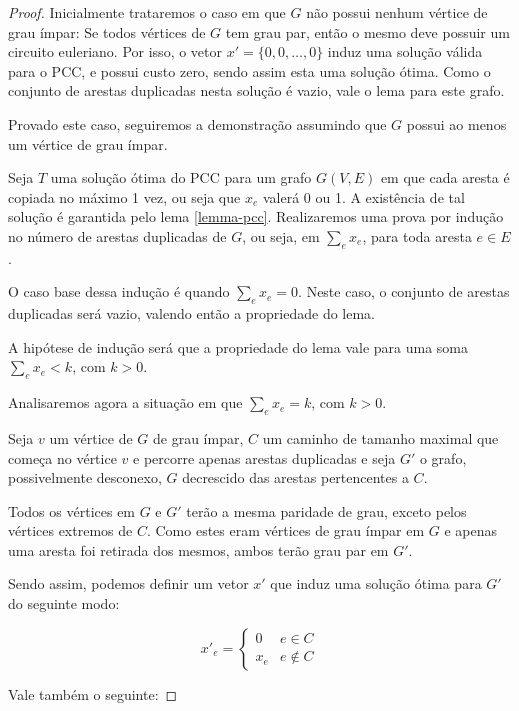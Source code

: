 \documentclass[12pt, a4paper]{article}
\begin{document}
\begin{proof}

    Inicialmente trataremos o caso em que $G$ não possui nenhum vértice de grau ímpar:
    Se todos vértices de $G$ tem grau par, então o mesmo deve possuir um circuito euleriano. 
    Por isso, o vetor $x' = \{0, 0, \dots, 0\}$ induz uma solução válida para o PCC, e possui custo zero, sendo assim esta uma solução ótima.
    Como o conjunto de arestas duplicadas nesta solução é vazio, vale o lema para este grafo.

    Provado este caso, seguiremos a demonstração assumindo que $G$ possui ao menos um vértice de grau ímpar.

    Seja $T$ uma solução ótima do PCC para um grafo $G(V, E)$  em que cada aresta é copiada no máximo 1 vez, ou seja que $x_e$ valerá 0 ou 1. 
    A existência de tal solução é garantida pelo lema \ref{lemma-pcc}.
    Realizaremos uma prova por indução no número de arestas duplicadas de $G$, ou seja, em $\sum_e x_e$, para toda aresta $e \in E$. 

    O caso base dessa indução é quando $\sum_e x_e = 0$. 
    Neste caso, o conjunto de arestas duplicadas será vazio, valendo então a propriedade do lema.

    A hipótese de indução será que a propriedade do lema vale para uma soma $\sum_e x_e < k$, com $k > 0$.

    Analisaremos agora a situação em que $\sum_e x_e = k$, com $k > 0$.

    Seja $v$ um vértice de $G$ de grau ímpar,  $C$ um caminho de tamanho maximal que começa no vértice $v$ e percorre apenas arestas duplicadas e seja $G'$ o grafo, possivelmente desconexo, $G$ decrescido das arestas pertencentes a $C$.


    Todos os vértices em $G$ e $G'$ terão a mesma paridade de grau, exceto pelos vértices extremos de $C$. 
    Como estes eram vértices de grau ímpar em $G$ e apenas uma aresta foi retirada dos mesmos, ambos terão grau par em $G'$.

    Sendo assim, podemos definir um vetor $x'$ que induz uma solução ótima para $G'$ do seguinte modo:

    \[ 
        x'_e = 
        \begin{cases} 
            0 & e \in C \\
            x_e & e \notin C 
        \end{cases}
    \]


    Vale também o seguinte:


\end{proof}
\end{document}
